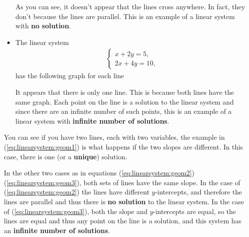 \begin{itemize}
\begin{center}
\end{center}
As you can see, it doesn't appear that the lines cross anywhere.  In fact, they don't because the lines are parallel.  This is an example of a linear system with \textbf{no solution}.


\item The linear system
%
\begin{align}
\begin{cases}
x + 2 y  = 5, \\
2x + 4 y = 10,
\end{cases} \label{eq:linearsystem:geom3}
\end{align}
%
has the following graph for each line
\begin{center}
\end{center}

It appears that there is only one line. This is because both lines have the same graph.  Each point on the line is a solution to the linear system and since there are an infinite number of such points, this is an example of a linear system with \textbf{infinite number of solutions}.

\end{itemize}

You can see if you have two lines, each with two variables, the example in (\ref{eq:linearsystem:geom1}) is what happens if the two slopes are different.  In this case, there is one (or a \textbf{unique}) solution. 

In the other two cases as in equations (\ref{eq:linearsystem:geom2}) (\ref{eq:linearsystem:geom3}), both sets of lines have the same slope. In the case of (\ref{eq:linearsystem:geom2}) the lines have different $y$-intercepts, and therefore the lines are parallel and thus there is \textbf{no solution} to the linear system.  In the case of (\ref{eq:linearsystem:geom3}), both the slope and $y$-intercepts are equal, so the lines are equal and thus any point on the line is a solution, and this system has an \textbf{infinite number of solutions}.


